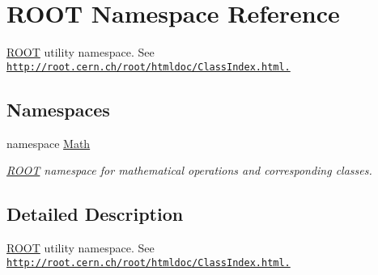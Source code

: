\hypertarget{namespace_r_o_o_t}{
\section{ROOT Namespace Reference}
\label{namespace_r_o_o_t}
}


\hyperlink{namespace_r_o_o_t}{ROOT} utility namespace. See \href{http://root.cern.ch/root/htmldoc/ClassIndex.html.}{\tt http://root.cern.ch/root/htmldoc/ClassIndex.html.}  
\subsection*{Namespaces}
\begin{DoxyCompactItemize}
\item 
namespace \hyperlink{namespace_r_o_o_t_1_1_math}{Math}


\begin{DoxyCompactList}\small\item\em \hyperlink{namespace_r_o_o_t}{ROOT} namespace for mathematical operations and corresponding classes. \item\end{DoxyCompactList}\end{DoxyCompactItemize}


\subsection{Detailed Description}
\hyperlink{namespace_r_o_o_t}{ROOT} utility namespace. See \href{http://root.cern.ch/root/htmldoc/ClassIndex.html.}{\tt http://root.cern.ch/root/htmldoc/ClassIndex.html.} 